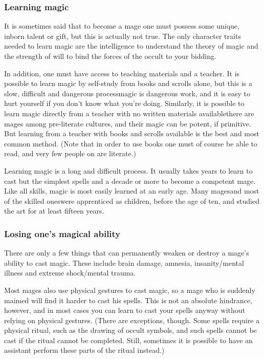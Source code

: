 \subsubsection{Learning magic}
It is sometimes said that to become a mage one must possess some unique, inborn talent or gift, but this is actually not true. The only character traits needed to learn magic are the intelligence to understand the theory of magic and the strength of will to bind the forces of the occult to your bidding. 

In addition, one must have access to teaching materials and a teacher. It is possible to learn magic by self-study from books and scrolls alone, but this is a slow, difficult and dangerous process\dash{}magic is dangerous work, and it is easy to hurt yourself if you don't know what you're doing. Similarly, it is possible to learn magic directly from a teacher with no written materials available\dash{}there are mages among pre-literate cultures, and their magic can be potent, if primitive. But learning from a teacher with books and scrolls available is the best and most common method. (Note that in order to use books one must of course be able to read, and very few people on \Miith{} are literate.) 

Learning magic is a long and difficult process. It usually takes years to learn to cast but the simplest spells and a decade or more to become a competent mage. Like all skills, magic is most easily learned at an early age. Many mages\dash{}and most of the skilled ones\dash{}were apprenticed as children, before the age of ten, and studied the art for at least fifteen years. 





\subsubsection{Losing one's magical ability}
There are only a few things that can permanently weaken or destroy a mage's ability to cast magic. These include brain damage, amnesia, insanity/mental illness and extreme shock/mental trauma. 

Most mages also use physical gestures to cast magic, so a mage who is suddenly maimed will find it harder to cast his spells. This is not an absolute hindrance, however, and in most cases you can learn to cast your spells anyway without relying on physical gestures. (There are exceptions, though. Some spells require a physical ritual, such as the drawing of occult symbols, and such spells cannot be cast if the ritual cannot be completed. Still, sometimes it is possible to have an assistant perform these parts of the ritual instead.)





